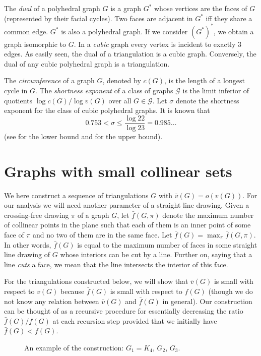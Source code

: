 \documentclass[reqno,12pt]{amsart}
\newcommand{\lin}[1]{\bar v(#1)}
\newcommand{\cut}[1]{\bar f(#1)}
\begin{document}
The \emph{dual} of a polyhedral graph $G$ is a graph $G^*$ whose
vertices are the faces of $G$ (represented by their facial cycles).
Two faces are adjacent in $G^*$ iff they share a common edge.
$G^*$ is also a polyhedral graph. If we consider $(G^*)^*$, we obtain
a graph isomorphic to $G$. In a \emph{cubic} graph every vertex is
incident to exactly 3 edges. As easily seen, the dual of a triangulation
is a cubic graph. Conversely, the dual of any cubic polyhedral graph 
is a triangulation.

The \emph{circumference} of a graph $G$, denoted by $c(G)$, is the
length of a longest cycle in $G$. The \emph{shortness exponent}
of a class of graphs $\mathcal G$ is the limit inferior of quotients $\log c(G)/\log v(G)$
over all $G\in\mathcal G$. Let $\sigma$ denote the shortness exponent
for the class of cubic polyhedral graphs. It is known that
$$
0.753<\sigma\le\frac{\log22}{\log23}=0.985\ldots
$$
(see \cite{BilinskiJMY11} for the lower bound and \cite[Theorem 7(iv)]{GWa} for the upper bound).




\section{Graphs with small collinear sets}\label{s:lin}

We here construct a sequence of triangulations $G$ with $\lin G=o(v(G))$.
For our analysis we will need another parameter of a straight line drawing.
Given a crossing-free drawing $\pi$ of a graph $G$,
let $\cut {G,\pi}$ denote the maximum number of collinear points in the plane
such that each of them is an inner point of some face of $\pi$
and no two of them are in the same face. Let $\cut G=\max_\pi\cut{G,\pi}$.
In other words, $\cut G$ is equal to the maximum number of faces in
some straight line drawing of $G$ whose interiors can be cut by a line.
Further on, saying that a line \emph{cuts} a face, we mean that the line
intersects the interior of this face.

For the triangulations constructed below, we will show that $\lin G$
is small with respect to $v(G)$ because $\cut G$ is small with respect
to $f(G)$ (though we do not know any relation between $\lin G$ and $\cut G$ in general). 
Our construction can be thought of as a recursive procedure
for essentially decreasing the ratio $\cut G/f(G)$ at each recursion step
provided that we initially have $\cut G<f(G)$.

\begin{figure}
\centerline{}
\caption{An example of the construction: $G_1=K_4$, $G_2$, $G_3$.}
\label{fig:fromK4}
\end{figure}
\end{document}
